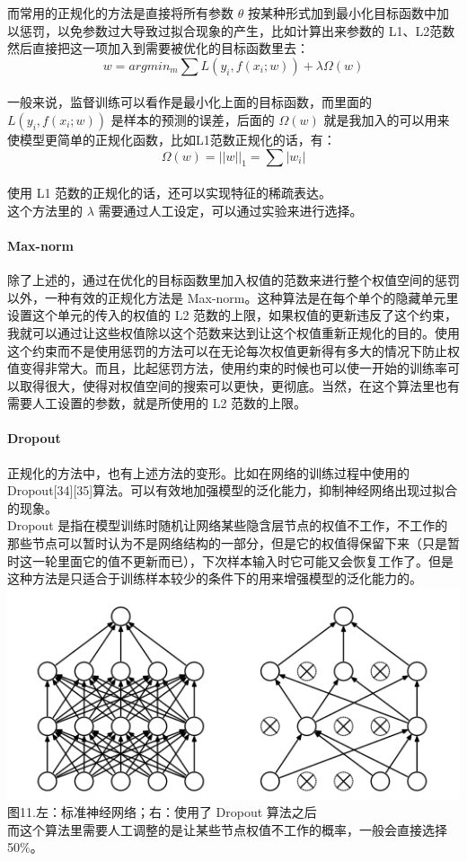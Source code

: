 而常用的正规化的方法是直接将所有参数 \(θ\)
按某种形式加到最小化目标函数中加以惩罚，以免参数过大导致过拟合现象的产生，比如计算出来参数的
L1、L2范数然后直接把这一项加入到需要被优化的目标函数里去：
\[w = arg min_m\sum L(y_i,f(x_i;w))+\lambda \Omega(w)\]\\一般来说，监督训练可以看作是最小化上面的目标函数，而里面的
\(L(y_i,f(x_i;w))\) 是样本的预测的误差，后面的 \(\Omega(w)\)
就是我加入的可以用来使模型更简单的正规化函数，比如L1范数正规化的话，有：
\[\Omega(w) = ||w||_1 = \sum|w_i|\]\\使用 L1
范数的正规化的话，还可以实现特征的稀疏表达。\\这个方法里的 \(\lambda\)
需要通过人工设定，可以通过实验来进行选择。

\paragraph{Max-norm}\label{max-norm}

除了上述的，通过在优化的目标函数里加入权值的范数来进行整个权值空间的惩罚以外，一种有效的正规化方法是
Max-norm。这种算法是在每个单个的隐藏单元里设置这个单元的传入的权值的 L2
范数的上限，如果权值的更新违反了这个约束，我就可以通过让这些权值除以这个范数来达到让这个权值重新正规化的目的。使用这个约束而不是使用惩罚的方法可以在无论每次权值更新得有多大的情况下防止权值变得非常大。而且，比起惩罚方法，使用约束的时候也可以使一开始的训练率可以取得很大，使得对权值空间的搜索可以更快，更彻底。当然，在这个算法里也有需要人工设置的参数，就是所使用的
L2 范数的上限。

\paragraph{Dropout}\label{dropout}

正规化的方法中，也有上述方法的变形。比如在网络的训练过程中使用的
Dropout{[}34{]}{[}35{]}算法。可以有效地加强模型的泛化能力，抑制神经网络出现过拟合的现象。\\Dropout
是指在模型训练时随机让网络某些隐含层节点的权值不工作，不工作的那些节点可以暂时认为不是网络结构的一部分，但是它的权值得保留下来（只是暂时这一轮里面它的值不更新而已），下次样本输入时它可能又会恢复工作了。但是这种方法是只适合于训练样本较少的条件下的用来增强模型的泛化能力的。\\\includegraphics{picture/dropout.png}\\图11.左：标准神经网络；右：使用了
Dropout
算法之后\\而这个算法里需要人工调整的是让某些节点权值不工作的概率，一般会直接选择
50\%。

